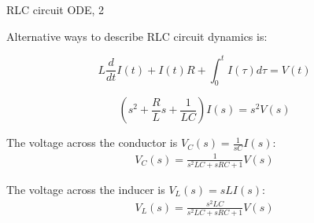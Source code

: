 \documentclass{beamer}
\begin{document}
\begin{frame}{RLC circuit ODE, 2}
	\begin{flushleft}
		
		Alternative ways to describe RLC circuit dynamics is:
		
		\begin{equation}
			L \frac{d}{dt}I(t) + I(t)R + \int_0^{t} I(\tau) d\tau = V(t)
		\end{equation}
		
		\begin{equation}
			\left(s^2 + \frac{R}{L}s + \frac{1}{LC} \right)I(s) = s^2V(s)
		\end{equation}
		
		The voltage across the conductor is $V_C(s) = \frac{1}{sC} I(s)$:
		\begin{align}
			V_C(s) = \frac{1}{s^2 LC + s RC + 1} V(s)
		\end{align}
		
		The voltage across the inducer is $V_L(s) = sLI(s)$:
		\begin{align}
			V_L(s) = \frac{s^2 LC}{s^2 LC + s RC + 1} V(s)
		\end{align}
		
		
	\end{flushleft}
\end{frame}




\myqrframe
\end{document}
